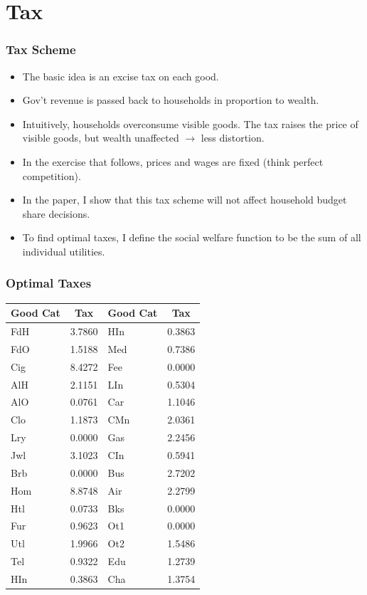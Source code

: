 \documentclass{beamer}
\begin{document}
  \section{Tax}
  \begin{frame}
    \frametitle{Tax Scheme}
    \begin{itemize}
      \item The basic idea is an excise tax on each good.
      \item Gov't revenue is passed back to households in proportion to wealth.
      \item Intuitively, households overconsume visible goods.  The tax raises the price of visible goods, but wealth unaffected $\rightarrow$ less distortion.
      \item In the exercise that follows, prices and wages are fixed (think perfect competition).
      \item In the paper, I show that this tax scheme will not affect household budget share decisions. 
      \item To find optimal taxes, I define the social welfare function to be the sum of all individual utilities.
    \end{itemize}
  \end{frame}
  \begin{frame}
    \frametitle{Optimal Taxes} 
\begin{table}
	\begin{center}
		\begin{tabular}{|l|c|l|c|}
			\hline
			\textbf{Good Cat} & \textbf{Tax} & \textbf{Good Cat} & \textbf{Tax}\\
			\hline
			FdH &  3.7860 & HIn &  0.3863\\
			\hline         
			FdO &  1.5188 & Med &  0.7386\\ 
			\hline        
			Cig &  8.4272 & Fee &  0.0000\\ 
			\hline       
			AlH &  2.1151 & LIn &  0.5304\\ 
			\hline      
			AlO &  0.0761 & Car &  1.1046\\ 
			\hline     
			Clo &  1.1873 & CMn &  2.0361\\ 
			\hline    
			Lry &  0.0000 & Gas &  2.2456\\ 
			\hline   
			Jwl &  3.1023 & CIn &  0.5941\\ 
			\hline  
			Brb &  0.0000 & Bus &  2.7202\\ 
			\hline 
			Hom &  8.8748 & Air &  2.2799\\ 
			\hline
			Htl &  0.0733 & Bks &  0.0000\\ 
			\hline
			Fur &  0.9623 & Ot1 &  0.0000\\ 
			\hline
			Utl &  1.9966 & Ot2 &  1.5486\\ 
			\hline
			Tel &  0.9322 & Edu &  1.2739\\ 
			\hline
			HIn &  0.3863 & Cha &  1.3754\\ 
		        \hline
		\end{tabular}
	\end{center}
	\label{tab:opttax}
\end{table}
  \end{frame}
\end{document}
